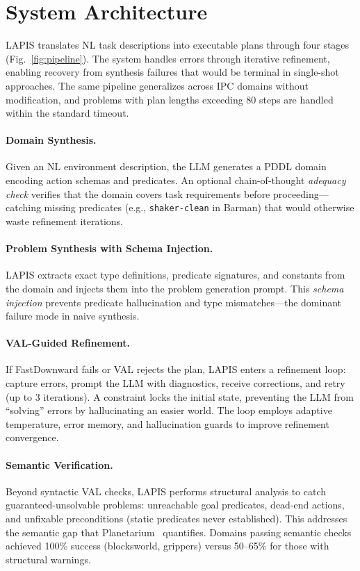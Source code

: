\documentclass[letterpaper]{article}
\begin{document}
\section{System Architecture}

LAPIS translates NL task descriptions into executable plans through four stages (Fig.~\ref{fig:pipeline}). The system handles errors through iterative refinement, enabling recovery from synthesis failures that would be terminal in single-shot approaches. The same pipeline generalizes across IPC domains without modification, and problems with plan lengths exceeding 80 steps are handled within the standard timeout.

\paragraph{Domain Synthesis.}
Given an NL environment description, the LLM generates a PDDL domain encoding action schemas and predicates. An optional chain-of-thought \emph{adequacy check} verifies that the domain covers task requirements before proceeding---catching missing predicates (e.g., \texttt{shaker-clean} in Barman) that would otherwise waste refinement iterations.

\paragraph{Problem Synthesis with Schema Injection.}
LAPIS extracts exact type definitions, predicate signatures, and constants from the domain and injects them into the problem generation prompt. This \emph{schema injection} prevents predicate hallucination and type mismatches---the dominant failure mode in naive synthesis.

\paragraph{VAL-Guided Refinement.}
If FastDownward fails or VAL rejects the plan, LAPIS enters a refinement loop: capture errors, prompt the LLM with diagnostics, receive corrections, and retry (up to 3 iterations). A constraint locks the initial state, preventing the LLM from ``solving'' errors by hallucinating an easier world. The loop employs adaptive temperature, error memory, and hallucination guards to improve refinement convergence.

\paragraph{Semantic Verification.}
Beyond syntactic VAL checks, LAPIS performs structural analysis to catch guaranteed-unsolvable problems: unreachable goal predicates, dead-end actions, and unfixable preconditions (static predicates never established). This addresses the semantic gap that Planetarium~\citep{planetarium2025} quantifies. Domains passing semantic checks achieved 100\% success (blocksworld, grippers) versus 50--65\% for those with structural warnings.
\end{document}
